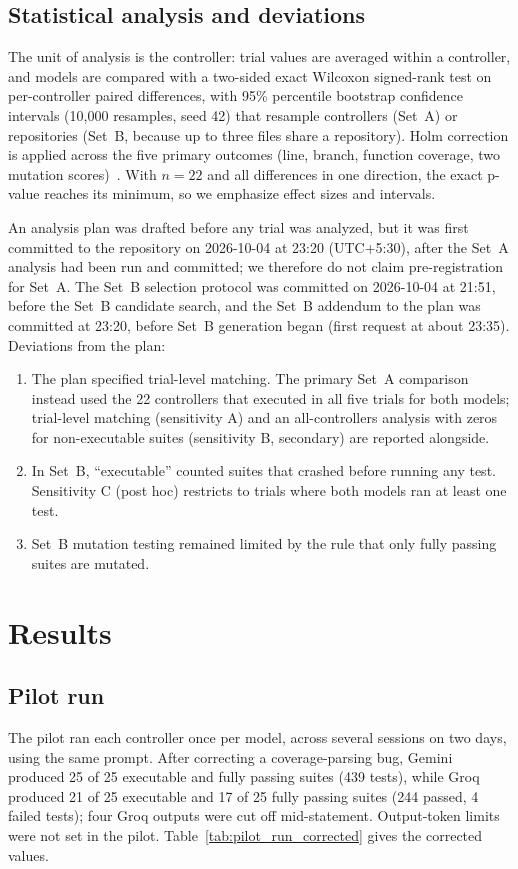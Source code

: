 \documentclass[sigconf]{acmart}
\begin{document}
\subsection{Statistical analysis and deviations}
The unit of analysis is the controller: trial values are averaged within a controller, and models are compared with a two-sided exact Wilcoxon signed-rank test on per-controller paired differences, with 95\% percentile bootstrap confidence intervals (10{,}000 resamples, seed 42) that resample controllers (Set~A) or repositories (Set~B, because up to three files share a repository). Holm correction is applied across the five primary outcomes (line, branch, function coverage, two mutation scores)~\cite{holm1979,wilcoxon1945,efron1979}. With $n=22$ and all differences in one direction, the exact p-value reaches its minimum, so we emphasize effect sizes and intervals.

An analysis plan was drafted before any trial was analyzed, but it was first committed to the repository on 2026-10-04 at 23:20 (UTC+5:30), after the Set~A analysis had been run and committed; we therefore do not claim pre-registration for Set~A. The Set~B selection protocol was committed on 2026-10-04 at 21:51, before the Set~B candidate search, and the Set~B addendum to the plan was committed at 23:20, before Set~B generation began (first request at about 23:35). Deviations from the plan:
\begin{enumerate}
\item The plan specified trial-level matching. The primary Set~A comparison instead used the 22 controllers that executed in all five trials for both models; trial-level matching (sensitivity A) and an all-controllers analysis with zeros for non-executable suites (sensitivity B, secondary) are reported alongside.
\item In Set~B, ``executable'' counted suites that crashed before running any test. Sensitivity C (post hoc) restricts to trials where both models ran at least one test.
\item Set~B mutation testing remained limited by the rule that only fully passing suites are mutated.
\end{enumerate}

\section{Results}
\subsection{Pilot run}\label{sec:pilot}
The pilot ran each controller once per model, across several sessions on two days, using the same prompt. After correcting a coverage-parsing bug, Gemini produced 25 of 25 executable and fully passing suites (439 tests), while Groq produced 21 of 25 executable and 17 of 25 fully passing suites (244 passed, 4 failed tests); four Groq outputs were cut off mid-statement. Output-token limits were not set in the pilot. Table~\ref{tab:pilot_run_corrected} gives the corrected values.
\end{document}
